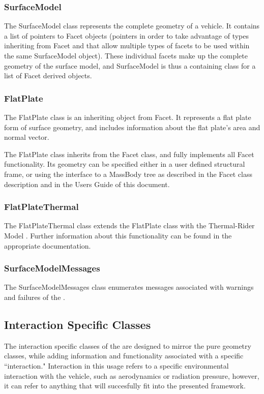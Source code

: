 \subsubsection{SurfaceModel}

The SurfaceModel class represents the complete geometry of a vehicle. It
contains a list of pointers to Facet objects (pointers in order to take advantage
of types inheriting from Facet and that allow multiple types of facets
to be used within the same SurfaceModel object). These individual facets
make up the
complete geometry of the surface model, and SurfaceModel is thus a containing
class for a list of Facet derived objects.

\subsubsection{FlatPlate}

The FlatPlate class is an inheriting object from Facet. It represents a flat
plate form of surface geometry, and includes information about the flat plate's
area and normal vector.

The FlatPlate class inherits from the Facet class, and fully implements
all Facet functionality. Its geometry can be specified either
in a user defined structural frame, or using the interface to a
MassBody tree
as described in the Facet class description and in the Users Guide
of this document.

\subsubsection{FlatPlateThermal}

The FlatPlateThermal class extends the FlatPlate class with the
Thermal-Rider Model \cite{dynenv:THERMALRIDER}. Further information
about this functionality can be found in the appropriate documentation.

\subsubsection{SurfaceModelMessages}

The SurfaceModelMessages class enumerates messages associated with
warnings and failures of the \ModelDesc.

\subsection{Interaction Specific Classes}

The interaction specific classes of the \ModelDesc are designed to mirror
the pure geometry classes, while adding information and functionality
associated with a specific ``interaction." Interaction in this usage refers
to a specific environmental interaction with the vehicle, such as aerodynamics
or radiation pressure, however, it can refer to anything that will succesfully
fit into the presented framework.

